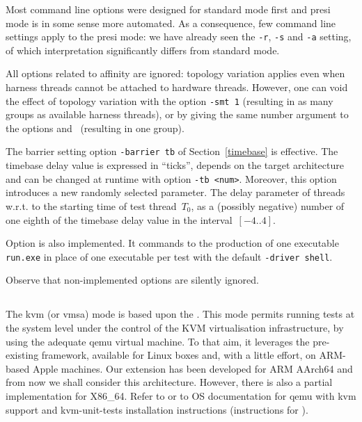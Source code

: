 Most command line options were designed for standard mode first and presi mode
is in some sense more automated. As a consequence, few command line
settings apply to the presi mode: we have already seen
the \texttt{-r}, \texttt{-s} and \texttt{-a} setting, of which interpretation
significantly differs from standard mode.

All options related to affinity are ignored: topology variation
applies even when harness  threads cannot be attached to hardware
threads. However, one can void the effect of topology variation with
the option \texttt{-smt 1} (resulting in as many groups as available
harness threads),  or by giving the same number argument to the
options  and~ (resulting in one group).

The barrier setting option \texttt{-barrier tb} of
Section~\ref{timebase} is effective. The  timebase delay value
is expressed in ``ticks'', depends on the target architecture and can
be changed at runtime with option \texttt{-tb <num>}.  Moreover, this
option introduces a new randomly selected parameter. The delay
parameter of threads w.r.t. to the starting time of test thread~$T_0$,
as a (possibly negative) number of one eighth of the timebase delay
value in the interval~$[-4..4]$.

Option  is also implemented. It
commands to the production of one executable \texttt{run.exe} in place
of one executable per test  with the default \texttt{-driver
shell}.

Observe that non-implemented options are silently ignored.


\subsection{}
The kvm (or vmsa) mode is based upon the .
This mode permits running tests at the system level under the
control of the KVM virtualisation infrastructure, by using the adequate
qemu virtual machine. To that aim, it leverages the
pre-existing 
framework, available for Linux boxes and, with a little effort, on
ARM-based Apple machines. Our extension has been developed for ARM
AArch64 and from now we shall consider this  architecture. However,
there is also a partial implementation for X86\_64. Refer to
or to OS documentation for qemu with kvm support and kvm-unit-tests
installation instructions (instructions
for ).

